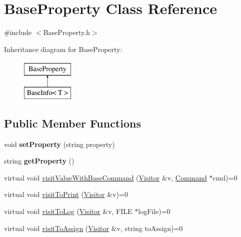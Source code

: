 \hypertarget{classBaseProperty}{}\section{Base\+Property Class Reference}
\label{classBaseProperty}


{\ttfamily \#include $<$Base\+Property.\+h$>$}

Inheritance diagram for Base\+Property\+:\begin{figure}[H]
\begin{center}
\leavevmode
\includegraphics[height=2.000000cm]{classBaseProperty}
\end{center}
\end{figure}
\subsection*{Public Member Functions}
\begin{DoxyCompactItemize}
\item 
void {\bfseries set\+Property} (string property)\hypertarget{classBaseProperty_add91584f9f27a6f0f6d723042403445a}{}\label{classBaseProperty_add91584f9f27a6f0f6d723042403445a}

\item 
string {\bfseries get\+Property} ()\hypertarget{classBaseProperty_a403ce39c3c637bdc45078c9e7e52e2b3}{}\label{classBaseProperty_a403ce39c3c637bdc45078c9e7e52e2b3}

\item 
virtual void \hyperlink{classBaseProperty_a83a5d6b8ebee03e73e11a7a57df56df3}{visit\+Value\+With\+Base\+Command} (\hyperlink{classVisitor}{Visitor} \&v, \hyperlink{classCommand}{Command} $\ast$cmd)=0
\item 
virtual void \hyperlink{classBaseProperty_a3c5334878537be377d3d50cc8b5091be}{visit\+To\+Print} (\hyperlink{classVisitor}{Visitor} \&v)=0
\item 
virtual void \hyperlink{classBaseProperty_a9e5f999d32dc4b0943948a70689565a1}{visit\+To\+Log} (\hyperlink{classVisitor}{Visitor} \&v, F\+I\+LE $\ast$log\+File)=0
\item 
virtual void \hyperlink{classBaseProperty_a5213a052c34530a5f561149d7b48db60}{visit\+To\+Assign} (\hyperlink{classVisitor}{Visitor} \&v, string to\+Assign)=0
\end{DoxyCompactItemize}



